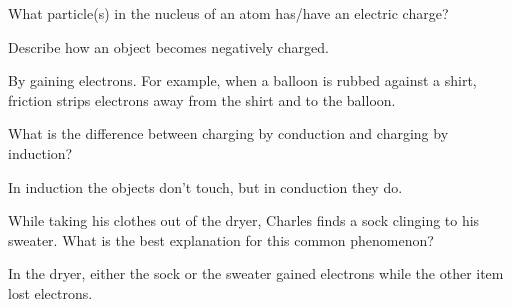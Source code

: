 \documentclass[answers]{exam}
\begin{document}
\begin{questions}
\question
What particle(s) in the nucleus of an atom has/have an electric charge? 


\question
Describe how an object becomes negatively charged.

\ifprintanswers
{\color{red}
By gaining electrons. For example, when a balloon is rubbed against a shirt, friction strips electrons away from the shirt and to the balloon.}
\else
\fillwithlines{1.3cm}
\fi


\question
What is the difference between charging by conduction and charging by induction?

\ifprintanswers
{\color{red}
In induction the objects don’t touch, but in conduction they do.
}
\else
\fillwithlines{1.3cm}
\fi


\question
While taking his clothes out of the dryer, Charles finds a sock clinging to his sweater. What is the best explanation for this common phenomenon? 

\ifprintanswers
{\color{red}
In the dryer, either the sock or the sweater gained electrons while the other item lost electrons.
}
\else
\fillwithlines{1.3cm}
\fi



\end{questions}
\end{document}
